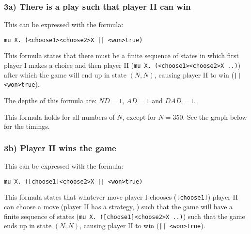 \documentclass[10pt,a4paper]{article}
\begin{document}
\subsubsection{3a) There is a play such that player II can win}
This can be expressed with the formula:

\begin{center}
	{\tt mu X. (<choose1><choose2>X || <won>true)}
\end{center}	
	
This formula states that there must be a finite sequence of states in which first player I makes a choice and then player II ({\tt mu X. (<choose1><choose2>X ..)}) after which the game will end up in state $(N, N)$, causing player II to win ({\tt || <won>true}).

The depths of this formula are: $ND = 1$, $AD = 1$ and $DAD = 1$.

This formula holds for all numbers of $N$, except for $N = 350$. See the graph below for the timings.


\subsubsection{3b) Player II wins the game}\label{board2}
This can be expressed with the formula:

\begin{center}
	{\tt mu X. ([choose1]<choose2>X || <won>true)}
\end{center}	
	
This formula states that whatever move player I chooses ({\tt [choose1]}) player II can choose a move (player II has a strategy, {\tt <choose2>}) such that the game will have a finite sequence of states ({\tt mu X. ([choose1]<choose2>X ..)}) such that the game ends up in state $(N, N)$, causing player II to win ({\tt || <won>true}).
\end{document}

